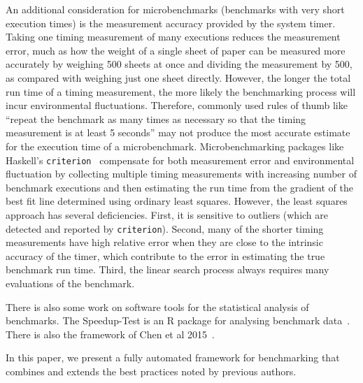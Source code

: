\documentclass[conference]{IEEEtran}
\begin{document}
An additional consideration for microbenchmarks (benchmarks with very short execution times)
is the measurement accuracy provided by the system timer.
Taking one timing measurement of many executions reduces the measurement error,
much as how the weight of a single sheet of paper can be measured more accurately
by weighing 500 sheets at once and dividing the measurement by 500,
as compared with weighing just one sheet directly.
However, the longer the total run time of a timing measurement, the more likely
the benchmarking process will incur environmental fluctuations.
Therefore, commonly used rules of thumb like
``repeat the benchmark as many times as necessary so that the timing measurement
is at least 5 seconds'' may not produce the most accurate estimate for the
execution time of a microbenchmark.
Microbenchmarking packages like Haskell's \lstinline|criterion|~\cite{criterion}
compensate for both measurement error and environmental fluctuation
by collecting multiple timing measurements with increasing number of benchmark
executions and then estimating the run time from the gradient of the best fit
line determined using ordinary least squares. However, the least squares approach
has several deficiencies. First, it is sensitive to outliers (which are detected and
reported by \lstinline|criterion|). Second, many of the shorter timing measurements
have high relative error when they are close to the intrinsic accuracy of the
timer, which contribute to the error in estimating the true benchmark run time.
Third, the linear search process always requires many evaluations of the benchmark.

There is also some work on software tools for the statistical analysis of benchmarks.
The Speedup-Test is an R package for analysing benchmark data~\cite{Touati2013}.
There is also the framework of Chen et al 2015~\cite{Chen2015}.


In this paper, we present a fully automated framework for benchmarking that
combines and extends the best practices noted by previous authors.
\end{document}
